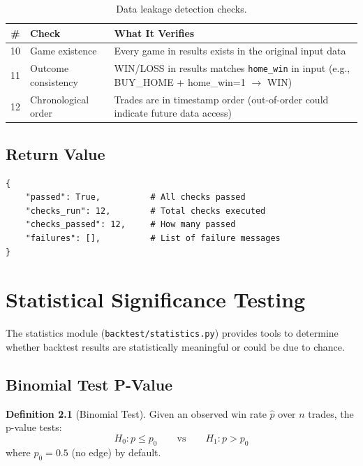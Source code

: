 \documentclass[12pt,a4paper]{report}
\theoremstyle{definition}
\newtheorem{definition}{Definition}[chapter]
\newcommand{\code}[1]{\texttt{#1}}
\newcommand{\file}[1]{\texttt{#1}}
\begin{document}
\begin{table}[H]
\centering
\caption{Data leakage detection checks.}
\label{tab:leakage-checks}
\begin{tabularx}{\textwidth}{clX}
\toprule
\textbf{\#} & \textbf{Check} & \textbf{What It Verifies} \\
\midrule
10 & Game existence   & Every game in results exists in the original input data \\
11 & Outcome consistency & WIN/LOSS in results matches \code{home\_win} in input (e.g., BUY\_HOME + home\_win=1 $\to$ WIN) \\
12 & Chronological order & Trades are in timestamp order (out-of-order could indicate future data access) \\
\bottomrule
\end{tabularx}
\end{table}

\section{Return Value}

\begin{lstlisting}[caption={Validation return structure.}]
{
    "passed": True,          # All checks passed
    "checks_run": 12,        # Total checks executed
    "checks_passed": 12,     # How many passed
    "failures": [],          # List of failure messages
}
\end{lstlisting}


\chapter{Statistical Significance Testing}
\label{ch:statistics}

The statistics module (\file{backtest/statistics.py}) provides tools to determine whether backtest results are statistically meaningful or could be due to chance.

\section{Binomial Test P-Value}
\label{sec:p-value}

\begin{definition}[Binomial Test]
Given an observed win rate $\hat{p}$ over $n$ trades, the p-value tests:
\begin{equation}
    H_0: p \leq p_0 \qquad \text{vs} \qquad H_1: p > p_0
    \label{eq:binomial-test}
\end{equation}
where $p_0 = 0.5$ (no edge) by default.
\end{definition}
\end{document}
